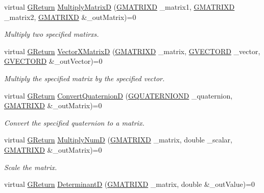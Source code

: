 \begin{DoxyCompactItemize}
virtual \hyperlink{namespaceGW_a67a839e3df7ea8a5c5686613a7a3de21}{G\+Return} \hyperlink{classGW_1_1MATH_1_1GMatrix_a613bcf953961899b45e6d97fc5afc2e1}{Multiply\+MatrixD} (\hyperlink{structGW_1_1MATH_1_1GMATRIXD}{G\+M\+A\+T\+R\+I\+XD} \+\_\+matrix1, \hyperlink{structGW_1_1MATH_1_1GMATRIXD}{G\+M\+A\+T\+R\+I\+XD} \+\_\+matrix2, \hyperlink{structGW_1_1MATH_1_1GMATRIXD}{G\+M\+A\+T\+R\+I\+XD} \&\+\_\+out\+Matrix)=0
\begin{DoxyCompactList}\small\item\em Multiply two specified matirxs. \end{DoxyCompactList}\item 
virtual \hyperlink{namespaceGW_a67a839e3df7ea8a5c5686613a7a3de21}{G\+Return} \hyperlink{classGW_1_1MATH_1_1GMatrix_a97cb7b6353e8f89405e44b09390a67cb}{Vector\+X\+MatrixD} (\hyperlink{structGW_1_1MATH_1_1GMATRIXD}{G\+M\+A\+T\+R\+I\+XD} \+\_\+matrix, \hyperlink{structGW_1_1MATH_1_1GVECTORD}{G\+V\+E\+C\+T\+O\+RD} \+\_\+vector, \hyperlink{structGW_1_1MATH_1_1GVECTORD}{G\+V\+E\+C\+T\+O\+RD} \&\+\_\+out\+Vector)=0
\begin{DoxyCompactList}\small\item\em Multiply the specified matrix by the specified vector. \end{DoxyCompactList}\item 
virtual \hyperlink{namespaceGW_a67a839e3df7ea8a5c5686613a7a3de21}{G\+Return} \hyperlink{classGW_1_1MATH_1_1GMatrix_a602c82afc9b9f55c10d6a61da54dcb6c}{Convert\+QuaternionD} (\hyperlink{structGW_1_1MATH_1_1GQUATERNIOND}{G\+Q\+U\+A\+T\+E\+R\+N\+I\+O\+ND} \+\_\+quaternion, \hyperlink{structGW_1_1MATH_1_1GMATRIXD}{G\+M\+A\+T\+R\+I\+XD} \&\+\_\+out\+Matrix)=0
\begin{DoxyCompactList}\small\item\em Convert the specified quaternion to a matrix. \end{DoxyCompactList}\item 
virtual \hyperlink{namespaceGW_a67a839e3df7ea8a5c5686613a7a3de21}{G\+Return} \hyperlink{classGW_1_1MATH_1_1GMatrix_a34e78f82e720eba937824cdc06490b9c}{Multiply\+NumD} (\hyperlink{structGW_1_1MATH_1_1GMATRIXD}{G\+M\+A\+T\+R\+I\+XD} \+\_\+matrix, double \+\_\+scalar, \hyperlink{structGW_1_1MATH_1_1GMATRIXD}{G\+M\+A\+T\+R\+I\+XD} \&\+\_\+out\+Matrix)=0
\begin{DoxyCompactList}\small\item\em Scale the matrix. \end{DoxyCompactList}\item 
virtual \hyperlink{namespaceGW_a67a839e3df7ea8a5c5686613a7a3de21}{G\+Return} \hyperlink{classGW_1_1MATH_1_1GMatrix_ab1b528820ac0476f8f3d9202a3036b8c}{DeterminantD} (\hyperlink{structGW_1_1MATH_1_1GMATRIXD}{G\+M\+A\+T\+R\+I\+XD} \+\_\+matrix, double \&\+\_\+out\+Value)=0

\end{DoxyCompactItemize}
